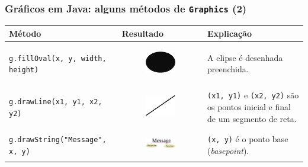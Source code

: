 \documentclass[xcolor={dvipsnames,table},aspectratio=169]{beamer}
\begin{document}
\begin{frame}[fragile]\frametitle{Gráficos em Java: alguns métodos de \texttt{Graphics} (2)}
{\scriptsize
\begin{center}
  \begin{tabular}{|p{6cm}|p{3cm}|p{4cm}|}
\hline
    \textbf{Método} & \textbf{Resultado} & \textbf{Explicação} \\
\hline
\texttt{g.fillOval(x, y, width, height)}
&
\begin{figure}[h]
	\includegraphics[height=0.1\paperheight,center]{pucrs-ep-fprog-unidade_04-lacos-laminas-elipse_preenchida.png}
\end{figure}
& A elipse é desenhada preenchida.\\
\hline
\texttt{g.drawLine(x1, y1, x2, y2)}
&
\begin{figure}[h]
	\includegraphics[height=0.1\paperheight,center]{pucrs-ep-fprog-unidade_04-lacos-laminas-reta.png}
\end{figure}
& \texttt{(x1, y1)} e \texttt{(x2, y2)} são os pontos inicial e final de um segmento de reta.\\
\hline
\texttt{g.drawString("Message", x, y)}
&
\begin{figure}[h]
	\includegraphics[height=0.1\paperheight,center]{pucrs-ep-fprog-unidade_04-lacos-laminas-message.png}
\end{figure}
	& \texttt{(x, y)} é o ponto base (\emph{basepoint}).\\
\hline
  \end{tabular}
\end{center}
}
\end{frame}
\end{document}
